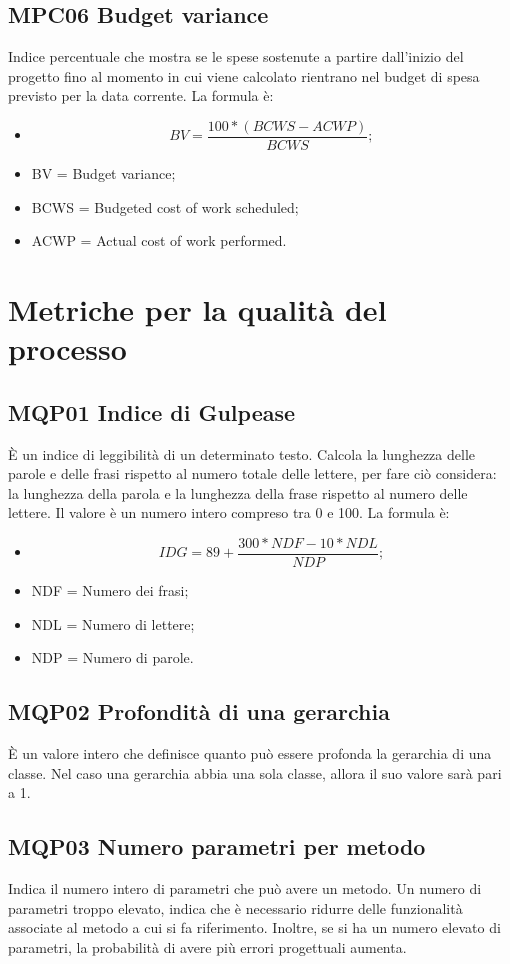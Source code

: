 \subsection{MPC06 Budget variance}
Indice percentuale che mostra se le spese sostenute a partire dall’inizio del progetto fino al momento in cui viene calcolato rientrano nel budget di spesa previsto per la data corrente.
La formula è:
\begin{itemize}
\item[] \[BV = \frac{100 * (BCWS - ACWP)}{BCWS};\]
\item BV = Budget variance;
\item BCWS = Budgeted cost of work scheduled;
\item ACWP = Actual cost of work performed.
\end{itemize}


\pagebreak

\section{Metriche per la qualità del processo}
\subsection{MQP01 Indice di Gulpease}
È un indice di leggibilità di un determinato testo. Calcola la lunghezza delle parole e delle frasi rispetto al numero totale delle lettere, per fare ciò considera: la lunghezza della parola e la lunghezza della frase rispetto al numero delle lettere. Il valore è un numero intero compreso tra 0 e 100.
La formula è:
\begin{itemize}
  \item[] \[IDG =  89 + \frac{300 * NDF - 10 * NDL}{NDP};\]
  \item NDF = Numero dei frasi;
  \item NDL = Numero di lettere;
  \item NDP = Numero di parole.
  \end{itemize}

\subsection{MQP02 Profondità di una gerarchia}
È un valore intero che definisce quanto può essere profonda la gerarchia di una classe. Nel caso una gerarchia abbia una sola classe, allora il suo valore sarà pari a 1.

\subsection{MQP03 Numero parametri per metodo}
Indica il numero intero di parametri che può avere un metodo. Un numero di parametri troppo elevato, indica che è necessario ridurre delle funzionalità associate al metodo a cui si fa riferimento. Inoltre, se si ha un numero elevato di parametri, la probabilità di avere più errori progettuali aumenta.

